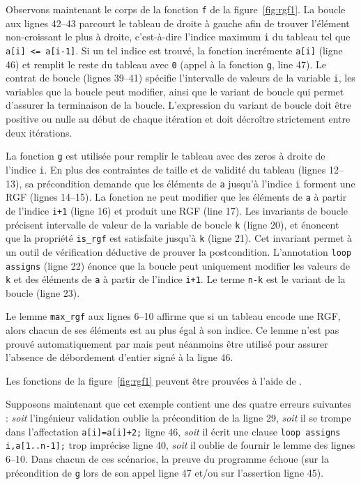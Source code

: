 Observons maintenant le corps de la fonction \lstinline{f} de la
figure~\ref{fig:rgf1}. 
La boucle aux lignes 42--43 parcourt le tableau de droite à gauche afin de
trouver l'élément non-croissant le plus à droite, c'est-à-dire l'indice maximum
\lstinline{i} du tableau tel que \lstinline{a[i] <= a[i-1]}.
Si un tel indice est trouvé, la fonction incrémente \lstinline{a[i]} (ligne 46)
et remplit le reste du tableau avec \lstinline{0} (appel à la fonction
\lstinline{g}, line 47).
Le contrat de boucle (lignes 39--41) spécifie l'intervalle de valeurs de la
variable \lstinline'i', les variables que la boucle peut modifier, ainsi que
le variant de boucle qui permet d'assurer la terminaison de la boucle.
L'expression du variant de boucle doit être positive ou nulle au début de chaque
itération et doit décroître strictement entre deux itérations.

La fonction \lstinline{g} est utilisée pour remplir le tableau avec des zeros
à droite de l'indice \lstinline{i}.
En plus des contraintes de taille et de validité du tableau (lignes 12--13),
sa précondition demande que les éléments de \lstinline{a} jusqu'à l'indice
\lstinline{i} forment une RGF (lignes 14--15).
La fonction ne peut modifier que les éléments de \lstinline{a} à partir de
l'indice \lstinline{i+1} (ligne 16) et produit une RGF (line 17).
Les invariants de boucle précisent intervalle de valeur de la variable de
boucle \lstinline{k} (ligne 20), et énoncent que la propriété \lstinline{is_rgf}
est satisfaite jusqu'à \lstinline{k} (ligne 21).
Cet invariant permet à un outil de vérification déductive de prouver la
postcondition.
L'annotation \lstinline{loop assigns} (ligne 22) énonce que la boucle peut
uniquement modifier les valeurs de \lstinline{k} et des éléments de
\lstinline{a} à partir de l'indice \lstinline{i+1}.
Le terme \lstinline{n-k} est le variant de la boucle (ligne 23).

Le \acsl lemme \lstinline'max_rgf' aux lignes 6--10 affirme que si un tableau
encode une RGF, alors chacun de ses éléments est au plus égal à son indice.
Ce lemme n'est pas prouvé automatiquement par \Wp mais peut néanmoins être
utilisé pour assurer l'absence de débordement d'entier signé à la ligne 46.

Les fonctions de la figure~\ref{fig:rgf1} peuvent être prouvées à l'aide de \Wp.

Supposons maintenant que cet exemple contient une des quatre erreurs suivantes :
\emph{soit} l'ingénieur validation oublie la précondition de la ligne 29,
\emph{soit} il se trompe dans l'affectation \lstinline[style=c]'a[i]=a[i]+2;'
ligne 46, \emph{soit} il écrit une clause
\lstinline[style=c]'loop assigns i,a[1..n-1];' trop imprécise ligne 40,
\emph{soit} il oublie de fournir le lemme des lignes 6--10.
Dans chacun de ces scénarios, la preuve du programme échoue (sur la précondition
de \lstinline{g} lors de son appel ligne 47 et/ou sur l'assertion ligne 45).


